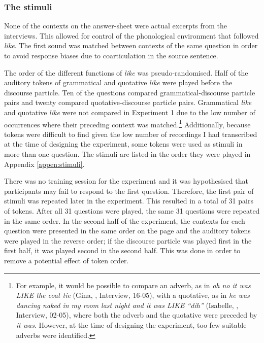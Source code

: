 \subsubsection{The stimuli}

None of the contexts on the answer-sheet were actual excerpts from the interviews. This allowed for control of the phonological environment that followed \textit{like}. The first sound was matched between contexts of the same question in order to avoid response biases due to coarticulation in the source sentence.

The order of the different functions of \textit{like} was pseudo-randomised. Half of the auditory tokens of grammatical and quotative \textit{like} were played before the discourse particle. Ten of the questions compared grammatical-discourse particle pairs and twenty compared quotative-discourse particle pairs. Grammatical \textit{like} and quotative \textit{like} were not compared in Experiment 1 due to the low number of occurrences where their preceding context was matched.\footnote{For example, it would be possible to compare an adverb, as in \textit{oh no it was LIKE the coat tie} (Gina, , Interview, 16-05), with a quotative, as in \textit{he was dancing naked in my room last night and it was LIKE ``dih''} (Isabelle, , Interview, 02-05), where both the adverb and the quotative were preceded by \textit{it was}. However, at the time of designing the experiment, too few suitable adverbs were identified.} Additionally, because tokens were difficult to find given the low number of recordings I had transcribed at the time of designing the experiment, some tokens were used as stimuli in more than one question. The stimuli are listed in the order they were played in Appendix \ref{appen:stimuli}.

There was no training session for the experiment and it was hypothesised that participants may fail to respond to the first question. Therefore, the first pair of stimuli was repeated later in the experiment.  This resulted in a total of 31 pairs of tokens. After all 31 questions were played, the same 31 questions were repeated in the same order. In the second half of the experiment, the contexts for each question were presented in the same order on the page and the auditory tokens were played in the reverse order; if the discourse particle was played first in the first half, it was played second in the second half. This was done in order to remove a potential effect of token order.

